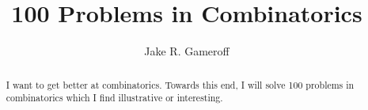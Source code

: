 
\makeatletter
\def\@settitle{\begin{center}%
  \baselineskip14\p@\relax
    \normalfont\Large%
\@title
  \end{center}%
}
\makeatother
\title{100 Problems in Combinatorics}
\author{Jake R. Gameroff}

\maketitle
\begin{abstract}
I want to get better at combinatorics. Towards this end, I will solve 100 problems in combinatorics which I find illustrative or interesting.
\end{abstract}
\vspace{0.5cm}



